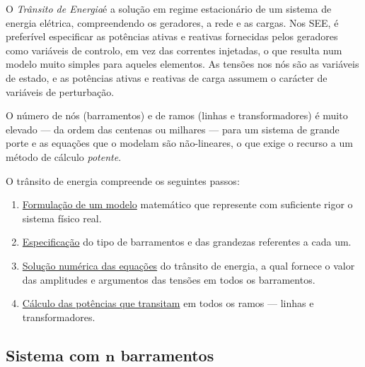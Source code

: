 \renewcommand{\thefootnote}{\fnsymbol{footnote}}

O \textit{Trânsito de Energia}\footnotemark[4] é a solução em regime estacionário de um sistema de energia elétrica, compreendendo os geradores, a rede e as cargas. Nos SEE, é preferível especificar as potências ativas e reativas fornecidas pelos geradores como variáveis de controlo, em vez das correntes injetadas, o que resulta num modelo muito simples para aqueles elementos. As tensões nos nós são as variáveis de estado, e as potências ativas e reativas de carga assumem o carácter de variáveis de perturbação.

O número de nós (barramentos) e de ramos (linhas e transformadores) é muito elevado --- da ordem das centenas ou milhares --- para um sistema de grande porte e as equações que o modelam são não-lineares, o que exige o recurso a um método de cálculo \textit{potente}.

\begin{mdframed}
    O trânsito de energia compreende os seguintes passos:
    \begin{enumerate}[label=\arabic*.,font=\small\bfseries]\small
        \item \underline{Formulação de um modelo} matemático que represente com suficiente rigor o sistema físico real.
        \item \underline{Especificação} do tipo de barramentos e das grandezas referentes a cada um.
        \item \underline{Solução numérica das equações} do trânsito de energia, a qual fornece o valor das amplitudes e argumentos das tensões em todos os barramentos.
        \item \underline{Cálculo das potências que transitam} em todos os ramos --- linhas e transformadores.
    \end{enumerate}
\end{mdframed}

\renewcommand{\thefootnote}{\arabic{footnote}}

\subsection[Sistema com $n$ barramentos]{Sistema com $\pmb{n}$ barramentos}

